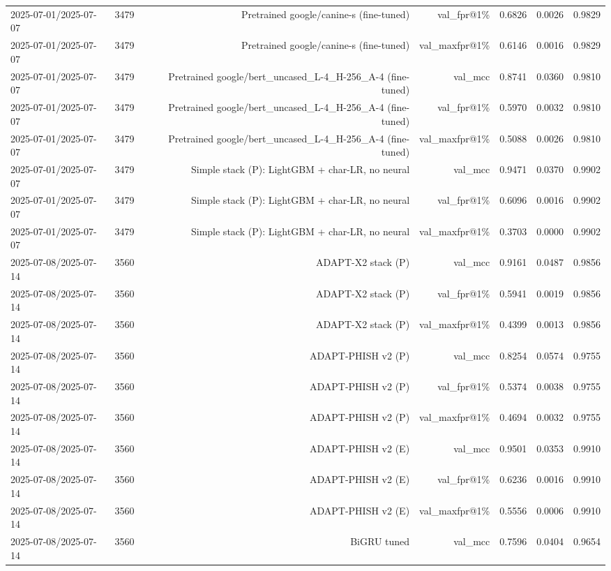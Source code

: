 \begin{table}[t]
\begin{tabular}{llrrrrr}
2025-07-01/2025-07-07 & 3479 & Pretrained google/canine-s (fine-tuned) & val\_fpr@1\% & 0.6826 & 0.0026 & 0.9829 \\
2025-07-01/2025-07-07 & 3479 & Pretrained google/canine-s (fine-tuned) & val\_maxfpr@1\% & 0.6146 & 0.0016 & 0.9829 \\
2025-07-01/2025-07-07 & 3479 & Pretrained google/bert\_uncased\_L-4\_H-256\_A-4 (fine-tuned) & val\_mcc & 0.8741 & 0.0360 & 0.9810 \\
2025-07-01/2025-07-07 & 3479 & Pretrained google/bert\_uncased\_L-4\_H-256\_A-4 (fine-tuned) & val\_fpr@1\% & 0.5970 & 0.0032 & 0.9810 \\
2025-07-01/2025-07-07 & 3479 & Pretrained google/bert\_uncased\_L-4\_H-256\_A-4 (fine-tuned) & val\_maxfpr@1\% & 0.5088 & 0.0026 & 0.9810 \\
2025-07-01/2025-07-07 & 3479 & Simple stack (P): LightGBM + char-LR, no neural & val\_mcc & 0.9471 & 0.0370 & 0.9902 \\
2025-07-01/2025-07-07 & 3479 & Simple stack (P): LightGBM + char-LR, no neural & val\_fpr@1\% & 0.6096 & 0.0016 & 0.9902 \\
2025-07-01/2025-07-07 & 3479 & Simple stack (P): LightGBM + char-LR, no neural & val\_maxfpr@1\% & 0.3703 & 0.0000 & 0.9902 \\
2025-07-08/2025-07-14 & 3560 & ADAPT-X2 stack (P) & val\_mcc & 0.9161 & 0.0487 & 0.9856 \\
2025-07-08/2025-07-14 & 3560 & ADAPT-X2 stack (P) & val\_fpr@1\% & 0.5941 & 0.0019 & 0.9856 \\
2025-07-08/2025-07-14 & 3560 & ADAPT-X2 stack (P) & val\_maxfpr@1\% & 0.4399 & 0.0013 & 0.9856 \\
2025-07-08/2025-07-14 & 3560 & ADAPT-PHISH v2 (P) & val\_mcc & 0.8254 & 0.0574 & 0.9755 \\
2025-07-08/2025-07-14 & 3560 & ADAPT-PHISH v2 (P) & val\_fpr@1\% & 0.5374 & 0.0038 & 0.9755 \\
2025-07-08/2025-07-14 & 3560 & ADAPT-PHISH v2 (P) & val\_maxfpr@1\% & 0.4694 & 0.0032 & 0.9755 \\
2025-07-08/2025-07-14 & 3560 & ADAPT-PHISH v2 (E) & val\_mcc & 0.9501 & 0.0353 & 0.9910 \\
2025-07-08/2025-07-14 & 3560 & ADAPT-PHISH v2 (E) & val\_fpr@1\% & 0.6236 & 0.0016 & 0.9910 \\
2025-07-08/2025-07-14 & 3560 & ADAPT-PHISH v2 (E) & val\_maxfpr@1\% & 0.5556 & 0.0006 & 0.9910 \\
2025-07-08/2025-07-14 & 3560 & BiGRU tuned & val\_mcc & 0.7596 & 0.0404 & 0.9654 \\

\end{tabular}
\end{table}

